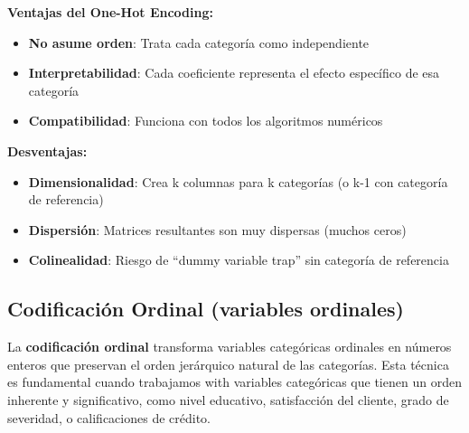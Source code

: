 \documentclass[
  letterpaper,
  DIV=11,
  numbers=noendperiod]{scrreprt}
\providecommand{\tightlist}{%
  \setlength{\itemsep}{0pt}\setlength{\parskip}{0pt}}
\begin{document}
\begin{tcolorbox}[enhanced jigsaw, breakable, toprule=.15mm, bottomtitle=1mm, coltitle=black, colbacktitle=quarto-callout-note-color!10!white, titlerule=0mm, opacitybacktitle=0.6, bottomrule=.15mm, toptitle=1mm, title=\textcolor{quarto-callout-note-color}{\faInfo}\hspace{0.5em}{Ventajas y desventajas}, arc=.35mm, rightrule=.15mm, opacityback=0, colframe=quarto-callout-note-color-frame, leftrule=.75mm, left=2mm, colback=white]

\textbf{Ventajas del One-Hot Encoding:}

\begin{itemize}
\tightlist
\item
  \textbf{No asume orden}: Trata cada categoría como independiente
\item
  \textbf{Interpretabilidad}: Cada coeficiente representa el efecto
  específico de esa categoría
\item
  \textbf{Compatibilidad}: Funciona con todos los algoritmos numéricos
\end{itemize}

\textbf{Desventajas:}

\begin{itemize}
\tightlist
\item
  \textbf{Dimensionalidad}: Crea k columnas para k categorías (o k-1 con
  categoría de referencia)
\item
  \textbf{Dispersión}: Matrices resultantes son muy dispersas (muchos
  ceros)
\item
  \textbf{Colinealidad}: Riesgo de ``dummy variable trap'' sin categoría
  de referencia
\end{itemize}

\end{tcolorbox}

\subsection{Codificación Ordinal (variables
ordinales)}\label{codificaciuxf3n-ordinal-variables-ordinales}

La \textbf{codificación ordinal} transforma variables categóricas
ordinales en números enteros que preservan el orden jerárquico natural
de las categorías. Esta técnica es fundamental cuando trabajamos with
variables categóricas que tienen un orden inherente y significativo,
como nivel educativo, satisfacción del cliente, grado de severidad, o
calificaciones de crédito.
\end{document}
